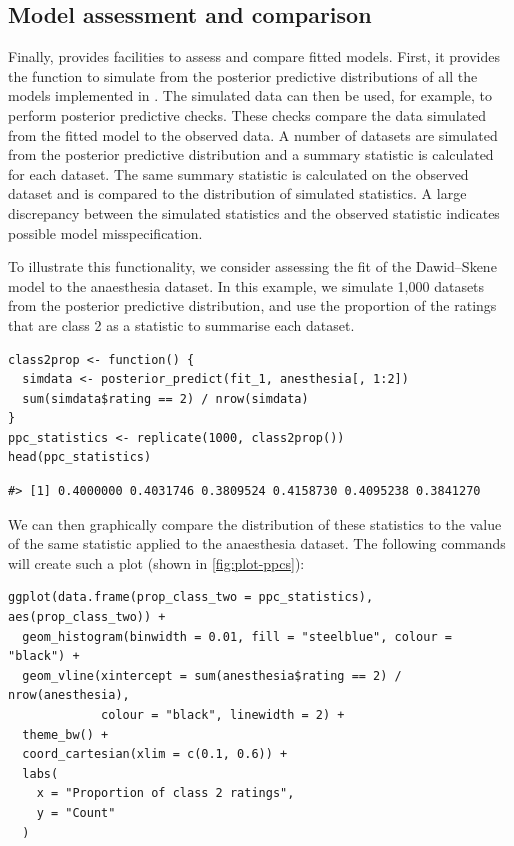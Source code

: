 \hypertarget{sec:model-assessment-comparison}{%
\subsection{Model assessment and comparison}\label{sec:model-assessment-comparison}}

Finally,  provides facilities to assess and compare fitted
models. First, it provides the  function to simulate from
the posterior predictive distributions of all the models implemented in
. The simulated data can then be used, for example, to perform
posterior predictive checks. These checks compare the data
simulated from the fitted model to the observed data. A number of datasets
are simulated from the posterior predictive distribution and a summary statistic
is calculated for each dataset. The same summary statistic is calculated on the
observed dataset and is compared to the distribution of simulated statistics.
A large discrepancy between the simulated statistics and the observed statistic
indicates possible model misspecification.

To illustrate this functionality, we consider assessing the fit of the
Dawid--Skene model to the anaesthesia dataset. In this example, we simulate
1,000 datasets from the posterior predictive distribution, and use the
proportion of the ratings that are class 2 as a statistic to summarise each
dataset.

\begin{verbatim}
class2prop <- function() {
  simdata <- posterior_predict(fit_1, anesthesia[, 1:2])
  sum(simdata$rating == 2) / nrow(simdata)
}
ppc_statistics <- replicate(1000, class2prop())
head(ppc_statistics)
\end{verbatim}

\begin{verbatim}
#> [1] 0.4000000 0.4031746 0.3809524 0.4158730 0.4095238 0.3841270
\end{verbatim}

We can then graphically compare the distribution of these statistics to the
value of the same statistic applied to the anaesthesia dataset. The following
commands will create such a plot (shown in \autoref{fig:plot-ppcs}):

\begin{verbatim}
ggplot(data.frame(prop_class_two = ppc_statistics), aes(prop_class_two)) +
  geom_histogram(binwidth = 0.01, fill = "steelblue", colour = "black") +
  geom_vline(xintercept = sum(anesthesia$rating == 2) / nrow(anesthesia),
             colour = "black", linewidth = 2) +
  theme_bw() +
  coord_cartesian(xlim = c(0.1, 0.6)) +
  labs(
    x = "Proportion of class 2 ratings",
    y = "Count"
  )
\end{verbatim}


